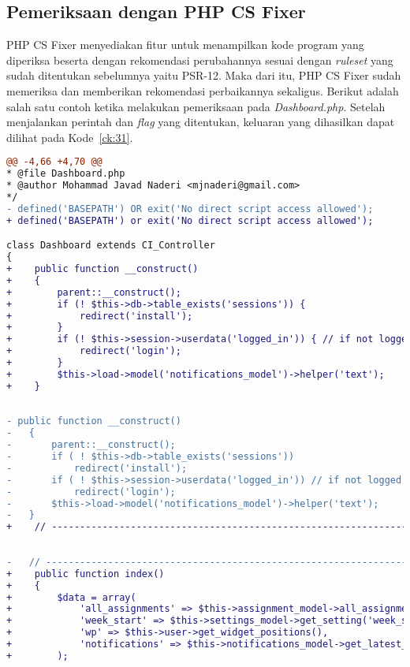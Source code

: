 \subsection{Pemeriksaan dengan PHP CS Fixer}
\label{subsec:periksa_otomatis}
PHP CS Fixer menyediakan fitur untuk menampilkan kode program yang diperiksa beserta dengan rekomendasi perubahannya sesuai dengan \textit{ruleset} yang sudah ditentukan sebelumnya yaitu PSR-12. Maka dari itu, PHP CS Fixer sudah memeriksa dan memberikan rekomendasi perbaikannya sekaligus. Berikut adalah salah satu contoh ketika melakukan pemeriksaan pada \textit{Dashboard.php}.  Setelah menjalankan perintah dan \textit{flag} yang ditentukan, keluaran yang dihasilkan dapat dilihat pada Kode~\ref{ck:31}. 

\begin{lstlisting}[language=diff, basicstyle=\ttfamily, frame=single,
	columns=fullflexible, keepspaces=true, breaklines=true, label=ck:31, caption=Contoh penggunaan PHP CS Fixer pada \textit{Dashboard.php}]
@@ -4,66 +4,70 @@
* @file Dashboard.php
* @author Mohammad Javad Naderi <mjnaderi@gmail.com>
*/
- defined('BASEPATH') OR exit('No direct script access allowed');
+ defined('BASEPATH') or exit('No direct script access allowed');

class Dashboard extends CI_Controller
{
+    public function __construct()
+    {
+        parent::__construct();
+        if (! $this->db->table_exists('sessions')) {
+            redirect('install');
+        }
+        if (! $this->session->userdata('logged_in')) { // if not logged in
+            redirect('login');
+        }
+        $this->load->model('notifications_model')->helper('text');
+    }
	
	
- public function __construct()
-	{
-		parent::__construct();
-		if ( ! $this->db->table_exists('sessions'))
-			redirect('install');
-		if ( ! $this->session->userdata('logged_in')) // if not logged in
-			redirect('login');
-		$this->load->model('notifications_model')->helper('text');
-	}
+    // ------------------------------------------------------------------------
	
	
-	// ------------------------------------------------------------------------
+    public function index()
+    {
+        $data = array(
+            'all_assignments' => $this->assignment_model->all_assignments(),
+            'week_start' => $this->settings_model->get_setting('week_start'),
+            'wp' => $this->user->get_widget_positions(),
+            'notifications' => $this->notifications_model->get_latest_notifications()
+        );
		

\end{lstlisting}
